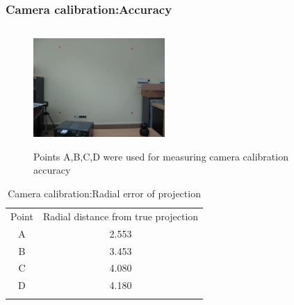 \documentclass[9pt]{beamer}
\begin{document}
\begin{frame}
\frametitle{Camera calibration:Accuracy}
\begin{figure}[ht]
\centering
\includegraphics[width=5cm,height=4.5cm]{../Thesis_work/Latex_thesis_work/img_source/camera_calib_test.jpg}
\caption{Points A,B,C,D were used for measuring camera calibration accuracy}
\label{fig:cam_calib_accuracy}
\end{figure}
\begin{table}[ht]
\centering
\vspace{-0.4cm}\begin{tabular}{c c}
\hline\noalign{\smallskip}
Point  & Radial distance from true projection \\
\noalign{\smallskip}\hline\noalign{\smallskip}
A   & 2.553  \\
B   & 3.453  \\
C   & 4.080 \\
D   & 4.180 \\
\noalign{\smallskip}\hline
\end{tabular}
\caption{Camera calibration:Radial error of projection}
\end{table}
\end{frame}
\end{document}

